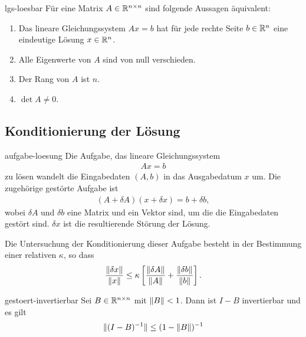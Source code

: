 
\begin{Satz}{lgs-loesbar}
  Für eine Matrix $A\in\mathbb R^{n\times n}$ sind folgende Aussagen äquivalent:
  \begin{enumerate}
  \item Das lineare Gleichungssystem $Ax=b$ hat für jede rechte Seite
    $b\in \mathbb R^n$ eine eindeutige Lösung $x\in \mathbb R^n$.
  \item Alle Eigenwerte von $A$ sind von null verschieden.
  \item Der Rang von $A$ ist $n$.
  \item $\det A \neq 0$.
  \end{enumerate}
\end{Satz}

\subsection{Konditionierung der Lösung}

\begin{Definition}{aufgabe-loesung}
  Die Aufgabe, das lineare Gleichungssystem
  \begin{gather}
    Ax=b
  \end{gather}
  zu lösen wandelt die Eingabedaten $(A,b)$ in das Ausgabedatum $x$
  um. Die zugehörige gestörte Aufgabe ist
  \begin{gather}
    (A+\delta A) (x+\delta x) = b+ \delta b,
  \end{gather}
  wobei $\delta A$ und $\delta b$ eine Matrix und ein Vektor sind, um
  die die Eingabedaten gestört sind. $\delta x$ ist die resultierende
  Störung der Lösung.
  
  Die Untersuchung der Konditionierung dieser Aufgabe besteht in
  der Bestimmung einer relativen  $\kappa$, so dass
  \begin{gather}
    \frac{\lVert\delta x\rVert}{\lVert x\rVert}
    \le \kappa \left[\frac{\lVert\delta A\rVert}{\lVert A\rVert}
      +\frac{\lVert\delta b\rVert}{\lVert b\rVert}\right].
  \end{gather}
\end{Definition}

\begin{Lemma}{gestoert-invertierbar}
  Sei $B\in \mathbb R^{n\times n}$ mit $\lVert B\rVert < 1$. Dann ist $I-B$
  invertierbar und es gilt
  \begin{gather}
    \lVert(I-B)^{-1}\rVert \le (1-\lVert B\rVert)^{-1}
  \end{gather}
\end{Lemma}

